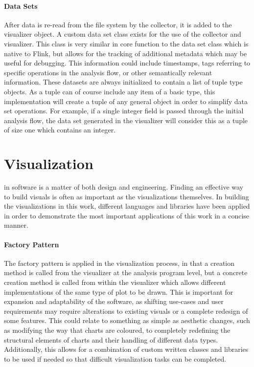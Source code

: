 \paragraph{Data Sets}
After data is re-read from the file system by the collector, it is added to the visualizer object. A custom data set class exists for the use of the collector and visualizer. This class is very similar in core function to the data set class which is native to Flink, but allows for the tracking of additional metadata which may be useful for debugging. This information could include timestamps, tags referring to specific operations in the analysis flow, or other semantically relevant information. These datasets are always initialized to contain a list of tuple type objects. As a tuple can of course include any item of a basic type, this implementation will create a tuple of any general object in order to simplify data set operations. For example, if a single integer field is passed through the initial analysis flow, the data set generated in the visualizer will consider this as a tuple of size one which contains an integer.



\section{Visualization}
\label{visualization}

 in software is a matter of both design and engineering. Finding an effective way to build visuals is often as important as the visualizations themselves. In building the visualizations in this work, different languages and libraries have been applied in order to demonstrate the most important applications of this work in a concise manner. 

\paragraph{Factory Pattern}
The factory pattern is applied in the visualization process, in that a creation method is called from the visualizer at the analysis program level, but a concrete creation method is called from within the visualizer which allows different implementations of the same type of plot to be drawn. This is important for expansion and adaptability of the software, as shifting use-cases and user requirements may require alterations to existing visuals or a complete redesign of some features. This could relate to something as simple as aesthetic changes, such as modifying the way that charts are coloured, to completely redefining the structural elements of charts and their handling of different data types. Additionally, this allows for a combination of custom written classes and libraries to be used if needed so that difficult visualization tasks can be completed.

